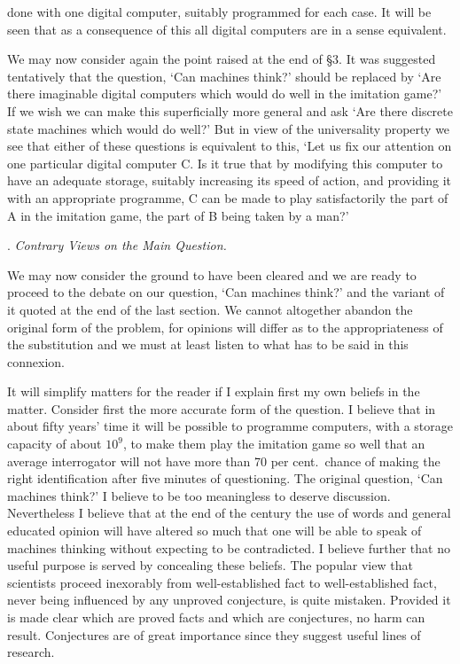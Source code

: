 \documentclass[10pt]{article} %
\begin{document}
done with one digital computer, suitably programmed for each case. It will be seen that as a consequence of this all digital computers are in a sense equivalent.

We may now consider again the point raised at the end of \S 3. It was suggested tentatively that the question, `Can machines think?' should be replaced by `Are there imaginable digital computers which would do well in the imitation game?' If we wish we can make this superficially more general and ask `Are there discrete state machines which would do well?' But in view of the universality property we see that either of these questions is equivalent to this, `Let us fix our attention on one particular digital computer C. Is it true that by modifying this computer to have an adequate storage, suitably increasing its speed of action, and providing it with an appropriate programme, C can be made to play satisfactorily the part of A in the imitation game, the part of B being taken by a man?'

\vspace{0.5\baselineskip} %
\noindent{}. \textit{Contrary Views on the Main Question.}
\vspace{0.5\baselineskip} %

We may now consider the ground to have been cleared and we are ready to proceed to the debate on our question, `Can machines think?' and the variant of it quoted at the end of the last section. We cannot altogether abandon the original form of the problem, for opinions will differ as to the appropriateness of the substitution and we must at least listen to what has to be said in this connexion.

It will simplify matters for the reader if I explain first my own beliefs in the matter. Consider first the more accurate form of the question. I believe that in about fifty years' time it will be possible to programme computers, with a storage capacity of about $10^9$, to make them play the imitation game so well that an average interrogator will not have more than 70 per cent.~chance of making the right identification after five minutes of questioning. The original question, `Can machines think?' I believe to be too meaningless to deserve discussion. Nevertheless I believe that at the end of the century the use of words and general educated opinion will have altered so much that one will be able to speak of machines thinking without expecting to be contradicted. I believe further that no useful purpose is served by concealing these beliefs. The popular view that scientists proceed inexorably from well-established fact to well-established fact, never being influenced by any unproved conjecture, is quite mistaken. Provided it is made clear which are proved facts and which are conjectures, no harm can result. Conjectures are of great importance since they suggest useful lines of research.
\end{document}
